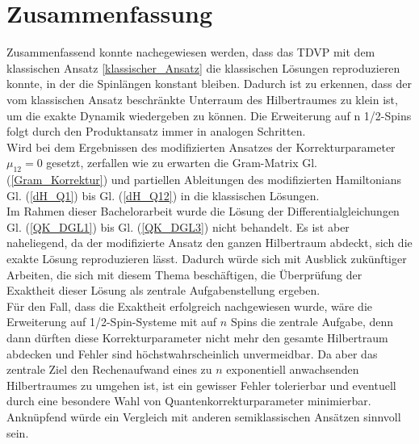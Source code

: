 \chapter{Zusammenfassung}
Zusammenfassend konnte nachegewiesen werden, dass das TDVP mit dem klassischen Ansatz \ref{klassischer_Ansatz} die klassischen Lösungen reproduzieren 
konnte, in der die Spinlängen konstant bleiben. Dadurch ist zu erkennen, dass der vom klassischen Ansatz beschränkte Unterraum des Hilbertraumes zu klein
ist, um die exakte Dynamik wiedergeben zu können. Die Erweiterung auf n 1/2-Spins folgt durch den Produktansatz immer in analogen Schritten.\\
Wird bei dem Ergebnissen des modifizierten Ansatzes der Korrekturparameter $\mu_{12}=0$ gesetzt, zerfallen wie zu erwarten
die Gram-Matrix Gl. (\ref{Gram_Korrektur}) und partiellen Ableitungen des modifizierten Hamiltonians Gl. (\ref{dH_Q1}) bis Gl. (\ref{dH_Q12})
in die klassischen Lösungen.\\

Im Rahmen dieser Bachelorarbeit wurde die Lösung der Differentialgleichungen Gl. (\ref{QK_DGL1}) bis Gl. (\ref{QK_DGL3}) nicht behandelt. Es ist 
aber naheliegend, da der modifizierte Ansatz den ganzen Hilbertraum abdeckt, sich die exakte Lösung reproduzieren lässt. Dadurch würde sich 
mit Ausblick zukünftiger Arbeiten, die sich mit diesem Thema beschäftigen, die Überprüfung der Exaktheit dieser Lösung als zentrale Aufgabenstellung ergeben. \\
Für den Fall, dass die Exaktheit erfolgreich nachgewiesen wurde, wäre die Erweiterung auf 1/2-Spin-Systeme mit auf $n$ Spins die zentrale Aufgabe, 
denn dann dürften diese Korrekturparameter nicht mehr den gesamte Hilbertraum abdecken und Fehler sind höchstwahrscheinlich unvermeidbar. 
Da aber das zentrale Ziel den Rechenaufwand eines zu $n$ exponentiell anwachsenden Hilbertraumes zu umgehen ist, ist 
ein gewisser Fehler tolerierbar und eventuell durch eine besondere Wahl von Quantenkorrekturparameter minimierbar. Anknüpfend würde ein Vergleich mit 
anderen semiklassischen Ansätzen sinnvoll sein.
